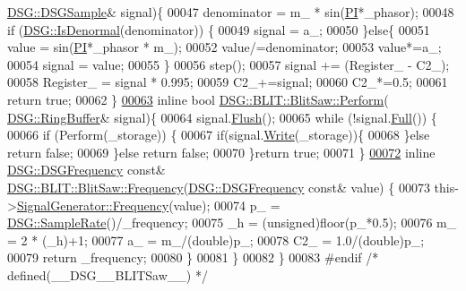 \begin{DoxyCode}
      \hyperlink{namespace_d_s_g_ac39a94cd27ebcd9c1e7502d0c624894a}{DSG::DSGSample}& signal)\{
00047             denominator = m\_ * sin(\hyperlink{_p_i_8h_a598a3330b3c21701223ee0ca14316eca}{PI}*\_phasor);
00048             \textcolor{keywordflow}{if} (\hyperlink{namespace_d_s_g_a9eee3c39a1f45d42f0b4fa7201d3ba3d}{DSG::IsDenormal}(denominator)) \{
00049                 signal = a\_;
00050             \}\textcolor{keywordflow}{else}\{
00051                 value = sin(\hyperlink{_p_i_8h_a598a3330b3c21701223ee0ca14316eca}{PI}*\_phasor * m\_);
00052                 value/=denominator;
00053                 value*=a\_;
00054                 signal = value;
00055             \}
00056             step();
00057             signal += (Register\_ - C2\_);
00058             Register\_ = signal * 0.995;
00059             C2\_+=signal;
00060             C2\_*=0.5;
00061             \textcolor{keywordflow}{return} \textcolor{keyword}{true};
00062         \}
\hypertarget{_b_l_i_t_saw_8h_source_l00063}{}\hyperlink{class_d_s_g_1_1_b_l_i_t_1_1_blit_saw_ad2edba8ed83558e76afed6ec1d5cf4d6}{00063}         \textcolor{keyword}{inline} \textcolor{keywordtype}{bool} \hyperlink{class_d_s_g_1_1_b_l_i_t_1_1_blit_saw_ae24821c51b23b9fe9220a620e558af04}{DSG::BLIT::BlitSaw::Perform}(
      \hyperlink{class_d_s_g_1_1_ring_buffer}{DSG::RingBuffer}& signal)\{
00064             signal.\hyperlink{class_d_s_g_1_1_ring_buffer_ab23c8003d2857809a816068eeb209d60}{Flush}();
00065             \textcolor{keywordflow}{while} (!signal.\hyperlink{class_d_s_g_1_1_ring_buffer_a53ddb04ffcbb5470a8d2b0a3c65b70cb}{Full}()) \{
00066                 \textcolor{keywordflow}{if} (Perform(\_storage)) \{
00067                     \textcolor{keywordflow}{if}(signal.\hyperlink{class_d_s_g_1_1_ring_buffer_aa5dd2caa0a270173251faee40a43d692}{Write}(\_storage))\{
00068                     \}\textcolor{keywordflow}{else} \textcolor{keywordflow}{return} \textcolor{keyword}{false};
00069                 \}\textcolor{keywordflow}{else} \textcolor{keywordflow}{return} \textcolor{keyword}{false};
00070             \}\textcolor{keywordflow}{return} \textcolor{keyword}{true};
00071         \}
\hypertarget{_b_l_i_t_saw_8h_source_l00072}{}\hyperlink{class_d_s_g_1_1_b_l_i_t_1_1_blit_saw_a290d01796efca84b73eb61a3bc419ebb}{00072}         \textcolor{keyword}{inline} \hyperlink{namespace_d_s_g_a4315a061386fa1014fda09b15d3a6973}{DSG::DSGFrequency} \textcolor{keyword}{const}& 
      \hyperlink{class_d_s_g_1_1_phasor_a6bdec1d2722e2fa5c7173ac5f7adf682}{DSG::BLIT::BlitSaw::Frequency}(\hyperlink{namespace_d_s_g_a4315a061386fa1014fda09b15d3a6973}{DSG::DSGFrequency} \textcolor{keyword}{const}& value)
      \{
00073             this->\hyperlink{class_d_s_g_1_1_phasor_a6bdec1d2722e2fa5c7173ac5f7adf682}{SignalGenerator::Frequency}(value);
00074             p\_ = \hyperlink{namespace_d_s_g_a72df05177db0412c3590070923f62819}{DSG::SampleRate}()/\_frequency;
00075             \_h = (unsigned)floor(p\_*0.5);
00076             m\_ = 2 * (\_h)+1;
00077             a\_ = m\_/(double)p\_;
00078             C2\_ = 1.0/(double)p\_;
00079             \textcolor{keywordflow}{return} \_frequency;
00080         \}
00081     \}
00082 \}
00083 \textcolor{preprocessor}{#endif }\textcolor{comment}{/* defined(\_\_DSG\_\_BLITSaw\_\_) */}\textcolor{preprocessor}{}
\end{DoxyCode}
